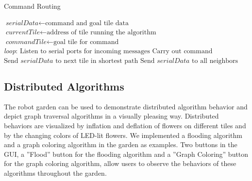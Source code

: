 \documentclass[letterpaper, 10 pt, conference]{ieeeconf}  %
\begin{document}
\begin{algorithm}
\caption{Command Routing}\label{euclid}
\begin{algorithmic}[1]
\State $\textit{serialData} \gets \text{command and goal tile data}$
\State $\textit{currentTile} \gets \text{address of tile running the algorithm}$
\State $\textit{commandTile} \gets \text{goal tile for command}$\\

\BState \emph{loop}:
\State $\text{Listen to serial ports for incoming messages}$
\State $\text{Carry out command}$
\Else 
{}
\State $\text{Send } \textit{serialData } \text{to next tile in shortest path}$
\Else
\State $\text{Send } \textit{serialData } \text{to } \text{all neighbors}$
\EndIf
\EndIf
\EndIf
\EndProcedure
\end{algorithmic}
\label{fig: alg1}
\end{algorithm}

\subsection{\textbf{Distributed Algorithms}}
The robot garden can be used to demonstrate distributed algorithm behavior and depict graph traversal algorithms in a visually pleasing way.  Distributed behaviors are visualized by inflation and deflation of flowers on different tiles and by the changing colors of LED-lit flowers.  We implemented a flooding algorithm and a graph coloring algorithm in the garden as examples.  Two buttons in the GUI, a ''Flood'' button for the flooding algorithm and a ''Graph Coloring'' button for the graph coloring algorithm, allow users to observe the behaviors of these algorithms throughout the garden.
\end{document}
